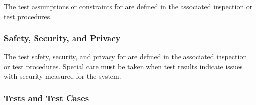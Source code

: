 The test assumptions or constraints for \TestIdNameX are defined in the associated inspection or test procedures.

\subsubsection{Safety, Security, and Privacy}
\label{loc:TestSafetySecurityPrivacy\TestIdName}

The test safety, security, and privacy for \TestIdNameX are defined in the associated inspection or test procedures.
Special care must be taken when test results indicate issues with security measured for the system.


\subsubsection{Tests and Test Cases}
\label{loc:TestsAndTestCases\TestIdName}
